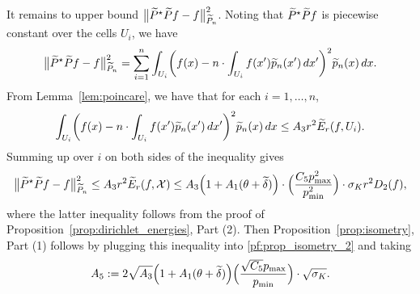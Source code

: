 It remains to upper bound $\bigl\|\widetilde{P}^{\star}\widetilde{P}f - f\bigr\|_{\widetilde{P}_n}^2$. Noting that $\widetilde{P}^{\star}\widetilde{P}f$ is piecewise constant over the cells $U_i$, we have
\begin{equation*}
\bigl\|\widetilde{P}^{\star}\widetilde{P}f - f\bigr\|_{\widetilde{P}_n}^2 = \sum_{i = 1}^{n} \int_{U_i} \biggl(f(x) - n\cdot\int_{U_i} f(x') \widetilde{p}_n(x') \,dx'\biggr)^2 \widetilde{p}_n(x) \,dx.
\end{equation*}
From Lemma~\ref{lem:poincare}, we have that for each $i = 1,\ldots,n$,
\begin{equation*}
\int_{U_i} \biggl(f(x) - n\cdot\int_{U_i} f(x') \widetilde{p}_n(x') \,dx'\biggr)^2 \widetilde{p}_n(x) \,dx \leq A_3r^2 \widetilde{E}_r(f,U_i).
\end{equation*}
Summing up over $i$ on both sides of the inequality gives
\begin{equation*}
\bigl\|\widetilde{P}^{\star}\widetilde{P}f - f\bigr\|_{\widetilde{P}_n}^2 \leq A_3r^2 \widetilde{E}_r(f,\mathcal{X}) \leq  A_3 \Bigl(1 + A_1(\theta + \widetilde{\delta})\Bigr) \cdot \Bigl(\frac{C_5 p_{\max}^2}{p_{\min}^2}\Bigr) \cdot \sigma_{K}r^2 D_2(f),
\end{equation*}
where the latter inequality follows from the proof of Proposition~\ref{prop:dirichlet_energies}, Part (2). Then Proposition~\ref{prop:isometry}, Part (1) follows by plugging this inequality into \eqref{pf:prop_isometry_2} and taking 
\begin{equation*}
A_5 := 2\sqrt{A_3} \Bigl(1 + A_1(\theta + \widetilde{\delta})\Bigr) \Bigl(\frac{\sqrt{C_5} p_{\max}}{p_{\min}}\Bigr) \cdot \sqrt{\sigma_{K}}.
\end{equation*}

